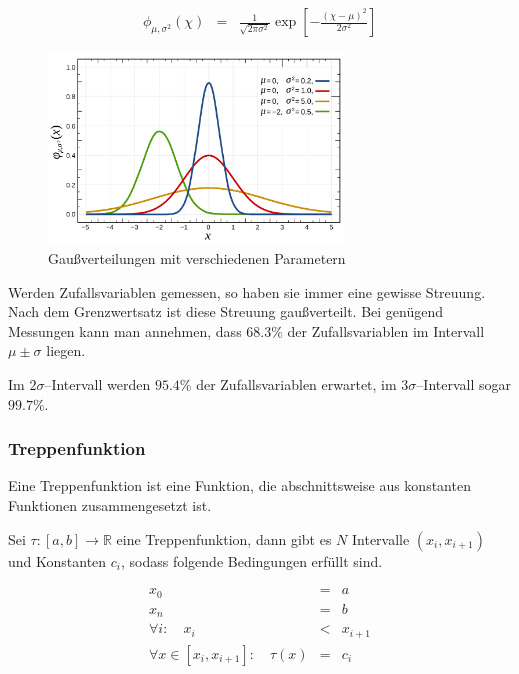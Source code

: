 \documentclass[12pt,a4paper]{scrartcl}
\numberwithin{equation}{section} %
\renewcommand{\[}{} %
\renewcommand{\]}{\noindent} %
\begin{document}
\[
\begin{eqnarray}
    \phi_{\mu,\sigma^2}(\chi) &=&
        \frac{1}{\sqrt{2\pi\sigma^2}}
        \exp\left[
            -
            \frac{(\chi - \mu)^2}{2\sigma^2}
        \right]
\end{eqnarray}
\]

\begin{figure}[h]
	\centering
	\includegraphics[width=0.7\textwidth]{../media/B1.1/Gaussverteilungen.pdf}
	\caption{Gaußverteilungen mit verschiedenen Parametern \cite{abb:gaussians}}
	\label{abb:gaussians}
\end{figure}

\noindent
Werden Zufallsvariablen gemessen, so haben sie immer eine gewisse Streuung. Nach dem Grenzwertsatz ist diese Streuung gaußverteilt. Bei genügend Messungen kann man annehmen, dass \(68.3\%\) der Zufallsvariablen im Intervall \(\mu\pm\sigma\) liegen.

Im \(2\sigma\)--Intervall werden \(95.4\%\) der Zufallsvariablen erwartet, im \(3\sigma\)--Intervall sogar \(99.7\%\).

\hypertarget{treppenfunktion}{%
\subsubsection{Treppenfunktion}\label{treppenfunktion}}

Eine Treppenfunktion ist eine Funktion, die abschnittsweise aus konstanten Funktionen zusammengesetzt ist.

Sei \(\tau:[a,b]\rightarrow \mathbb R\) eine Treppenfunktion, dann gibt es \(N\) Intervalle \((x_i, x_{i+1})\) und Konstanten \(c_i\), sodass folgende Bedingungen erfüllt sind. \cite{Einsiedler}

\[
\begin{eqnarray}
    x_0 &=& a \\
    x_n &=& b \\
    \forall i:\quad
        x_i &<& x_{i+1} \\
    \forall x\in[x_i, x_{i+1}]:\quad
        \tau(x) &=& c_i
\end{eqnarray}
\]
\end{document}
